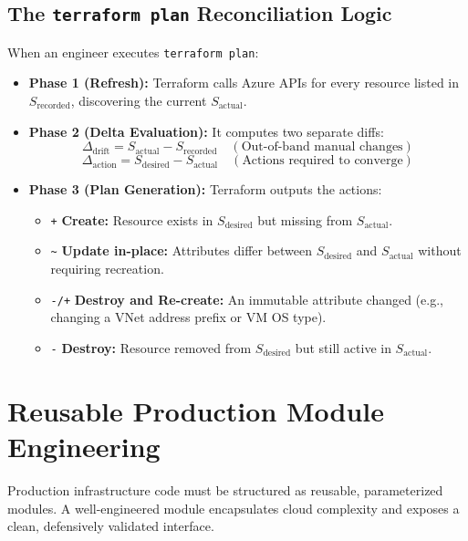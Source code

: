 \subsection{The \texttt{terraform plan} Reconciliation Logic}
When an engineer executes \texttt{terraform plan}:
\begin{itemize}[leftmargin=12pt]
  \item \textbf{Phase 1 (Refresh):} Terraform calls Azure APIs for every resource listed in $S_{\text{recorded}}$, discovering the current $S_{\text{actual}}$.
  \item \textbf{Phase 2 (Delta Evaluation):} It computes two separate diffs:
  \begin{equation}
  \Delta_{\text{drift}} = S_{\text{actual}} - S_{\text{recorded}} \quad (\text{Out-of-band manual changes})
  \end{equation}
  \begin{equation}
  \Delta_{\text{action}} = S_{\text{desired}} - S_{\text{actual}} \quad (\text{Actions required to converge})
  \end{equation}
  \item \textbf{Phase 3 (Plan Generation):} Terraform outputs the actions:
  \begin{itemize}[leftmargin=10pt]
    \item \texttt{+} \textbf{Create:} Resource exists in $S_{\text{desired}}$ but missing from $S_{\text{actual}}$.
    \item \texttt{\textasciitilde{}} \textbf{Update in-place:} Attributes differ between $S_{\text{desired}}$ and $S_{\text{actual}}$ without requiring recreation.
    \item \texttt{-/+} \textbf{Destroy and Re-create:} An immutable attribute changed (e.g., changing a VNet address prefix or VM OS type).
    \item \texttt{-} \textbf{Destroy:} Resource removed from $S_{\text{desired}}$ but still active in $S_{\text{actual}}$.
  \end{itemize}
\end{itemize}

\section{Reusable Production Module Engineering}

Production infrastructure code must be structured as reusable, parameterized modules. A well-engineered module encapsulates cloud complexity and exposes a clean, defensively validated interface.

